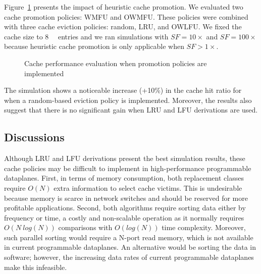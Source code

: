 Figure~\ref{fig:promo_fig} presents the impact of heuristic cache promotion. 
We evaluated two cache promotion policies: WMFU and OWMFU.
These policies were combined with three cache eviction policies: random, LRU, and OWLFU.
We fixed the cache size to \SI{8}{\kilo\nothing} entries and we ran simulations with $SF=10\times$ and $SF=100\times$ because heuristic cache promotion is only applicable when $SF>1\times$.
\begin{figure}[]
	\centering
	\qquad
	\caption{Cache performance evaluation when promotion policies are implemented}
	\label{fig:promo_fig}
\end{figure}

The simulation shows a noticeable increase (+10\%) in the cache hit ratio for when a random-based eviction policy is implemented.
Moreover, the results also suggest that there is no significant gain when LRU and LFU derivations are used.

\subsection{Discussions}

Although LRU and LFU derivations present the best simulation results, these cache policies may be difficult to implement in high-performance programmable dataplanes.
First, in terms of memory consumption, both replacement classes require $O(N)$ extra information to select cache victims.
This is undesirable because memory is scarce in network switches and should be reserved for more profitable applications.
Second, both algorithms require sorting data either by frequency or time, a costly and non-scalable operation as it normally requires $O(N~log(N))$ comparisons with $O(log(N))$ time complexity.
Moreover, such parallel sorting would require a N-port read memory, which is not available in current programmable dataplanes.
An alternative would be sorting the data in software; however, the increasing data rates of current programmable dataplanes make this infeasible.  

